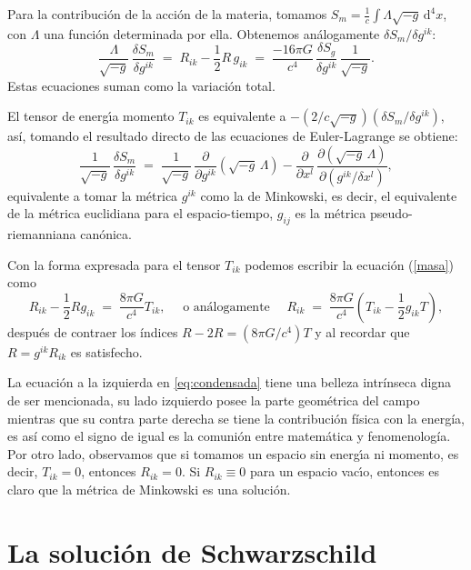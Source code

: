 \documentclass[12pt]{article}
\newcommand{\dx}{\textrm{d}}
\newcommand{\pa}{\partial}
\begin{document}
Para la contribución de la acci\'on de la materia, tomamos $S_m = \frac{1}{c}\int\Lambda\sqrt{-g}\,\dx^4x$, con $\Lambda$ una funci\'on determinada por ella. Obtenemos an\'alogamente $\delta S_m/\delta g^{ik}$:
\begin{equation}
\label{masa}
\frac{\Lambda}{\sqrt{-g}}\,\frac{\delta S_m}{\delta g^{ik}} \;=\;
R_{ik}-\frac{1}{2} R\,g_{ik} \;=\; 
\frac{-16\pi G}{c^4}\,\frac{\delta S_g}{\delta g^{ik}}\,\frac{1}{\sqrt{-g}}.
\end{equation}
Estas ecuaciones suman como la variaci\'on total.

El tensor de energ\'{\i}a momento $T_{ik}$ es equivalente a $-(2/c\sqrt{-g})(\delta S_m/\delta g^{ik})$, así, tomando el resultado directo de las ecuaciones de Euler-Lagrange se obtiene:
$$\frac{1}{\sqrt{-g}}\,\frac{\delta S_m}{\delta g^{ik}} \;=\;
\frac{1}{\sqrt{-g}}\,\frac{\pa}{\pa g^{ik}}(\sqrt{-g}\,\Lambda)-\frac{\pa}{\pa x^l}\,\frac{\pa(\sqrt{-g}\,\Lambda)}{\pa(g^{ik}/\delta x^l)},$$
equivalente a tomar la métrica $g^{ik}$ como la de Minkowski, es decir, el equivalente de la métrica euclidiana para el espacio-tiempo, $g_{ij}$ es la métrica pseudo-riemanniana canónica.

Con la forma expresada para el tensor $T_{ik}$ podemos escribir la ecuaci\'on (\ref{masa}) como
\begin{equation}
\label{eq:condensada}
R_{ik}-\frac{1}{2} Rg_{ik} \;=\; \frac{8\pi G}{c^4}T_{ik},
\quad\text{ o análogamente }\quad
R_{ik} \;=\; \frac{8\pi G}{c^4}\left(T_{ik}-\frac{1}{2} g_{ik}T\right),
\end{equation}
después de contraer los índices $R-2R=(8\pi G/c^4)T$ y al recordar que $R=g^{ik}R_{ik}$ es satisfecho.

La ecuación a la izquierda en \eqref{eq:condensada} tiene una belleza intrínseca digna de ser mencionada, su lado izquierdo posee la parte geométrica del campo mientras que su contra parte derecha se tiene la contribución física con la energía, es así como el signo de igual es la comunión entre matemática y fenomenología. Por otro lado, observamos que si tomamos un espacio sin energ\'{\i}a ni momento, es decir, $T_{ik}=0$, entonces $R_{ik}=0$. Si $R_{ik}\equiv 0$ para un espacio vac\'{\i}o, entonces es claro que la m\'etrica de Minkowski es una soluci\'on.


\section{La soluci\'on de Schwarzschild}
\end{document}
